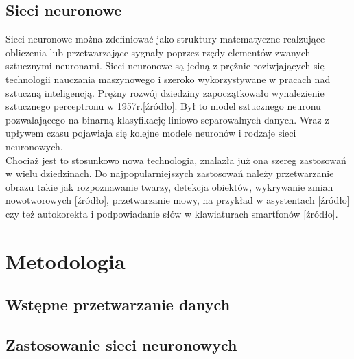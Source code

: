 \documentclass[12pt, a4paper, oneside]{article}
\begin{document}
	
	\subsection{Sieci neuronowe}
	Sieci neuronowe można zdefiniować jako struktury matematyczne realzujące obliczenia lub przetwarzające sygnały poprzez rzędy elementów zwanych sztucznymi neuronami. \cite{Sieci}
	Sieci neuronowe są jedną z prężnie roziwjających się technologii nauczania maszynowego i szeroko wykorzystywane w pracach nad sztuczną inteligencją.
	Prężny rozwój dziedziny zapoczątkowało wynalezienie sztucznego perceptronu w 1957r.[źródło]. Był to model sztucznego neuronu pozwalającego na binarną klasyfikację liniowo separowalnych danych. Wraz z upływem czasu pojawiaja się kolejne modele neuronów i rodzaje sieci neuronowych. 
	\\
	Chociaż jest to stosunkowo nowa technologia, znalazła już ona szereg zastosowań w wielu dziedzinach. Do najpopularniejszych zastosowań należy przetwarzanie obrazu takie jak rozpoznawanie twarzy, detekcja obiektów, wykrywanie zmian nowotworowych [źródło], przetwarzanie mowy, na przykład w asystentach [źródło] czy też autokorekta i podpowiadanie słów w klawiaturach smartfonów [źródło].
	
	
	
	\section{Metodologia}
	
	\subsection{Wstępne przetwarzanie danych}
	\cite{Python}
	\subsection{Zastosowanie sieci neuronowych}
	
	
	
	
	\cite{Wylomanska01}
	
	
	
\end{document}
